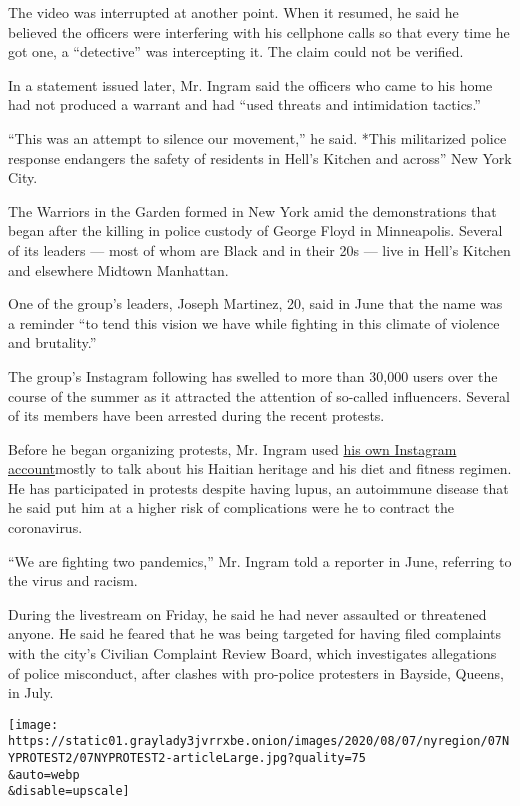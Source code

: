 The video was interrupted at another point. When it resumed, he said he
believed the officers were interfering with his cellphone calls so that
every time he got one, a ``detective'' was intercepting it. The claim
could not be verified.

In a statement issued later, Mr. Ingram said the officers who came to
his home had not produced a warrant and had ``used threats and
intimidation tactics.''~

``This was an attempt to silence our movement,'' he said. *This
militarized police response endangers the safety of residents in Hell's
Kitchen and across'' New York City.

The Warriors in the Garden formed in New York amid the demonstrations
that began after the killing in police custody of George Floyd in
Minneapolis. Several of its leaders --- most of whom are Black and in
their 20s --- live in Hell's Kitchen and elsewhere Midtown Manhattan.

One of the group's leaders, Joseph Martinez, 20, said in June that the
name was a reminder ``to tend this vision we have while fighting in this
climate of violence and brutality.''

The group's Instagram following has swelled to more than 30,000 users
over the course of the summer as it attracted the attention of so-called
influencers. Several of its members have been arrested during the recent
protests.

Before he began organizing protests, Mr. Ingram used
\href{https://www.instagram.com/iamdwreck/}{his own Instagram
account}mostly to talk about his Haitian heritage and his diet and
fitness regimen. He has participated in protests despite having lupus,
an autoimmune disease that he said put him at a higher risk of
complications were he to contract the coronavirus.

``We are fighting two pandemics,'' Mr. Ingram told a reporter in June,
referring to the virus and racism.

During the livestream on Friday, he said he had never assaulted or
threatened anyone. He said he feared that he was being targeted for
having filed complaints with the city's Civilian Complaint Review Board,
which investigates allegations of police misconduct, after clashes with
pro-police protesters in Bayside, Queens, in July.

\texttt{[image: https://static01.graylady3jvrrxbe.onion/images/2020/08/07/nyregion/07NYPROTEST2/07NYPROTEST2-articleLarge.jpg?quality=75\\\&auto=webp\\\&disable=upscale]}

